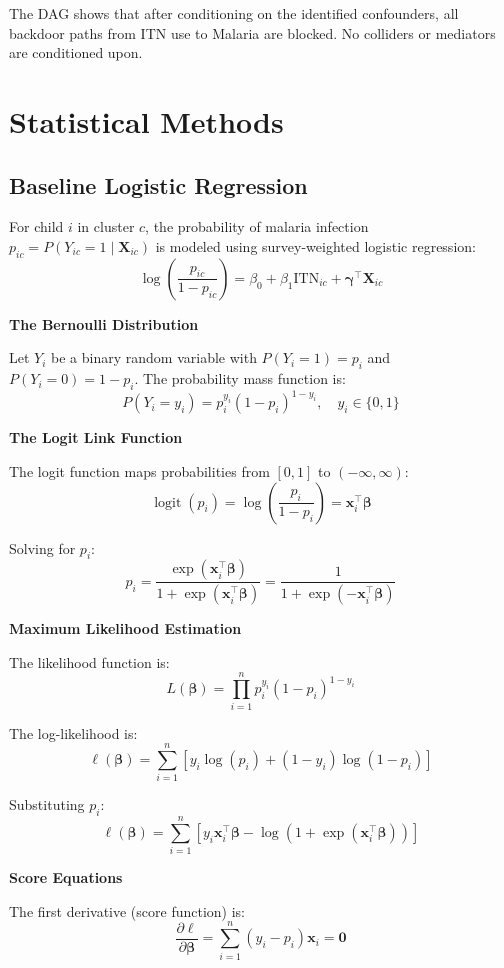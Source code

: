 The DAG shows that after conditioning on the identified confounders, all backdoor paths from ITN use to Malaria are blocked. No colliders or mediators are conditioned upon.

\section{Statistical Methods}

\subsection{Baseline Logistic Regression}

For child $i$ in cluster $c$, the probability of malaria infection $p_{ic} = P(Y_{ic} = 1 \mid \mathbf{X}_{ic})$ is modeled using survey-weighted logistic regression:
\[
\log\left(\frac{p_{ic}}{1-p_{ic}}\right) = \beta_0 + \beta_1 \text{ITN}_{ic} + \boldsymbol{\gamma}^\top \mathbf{X}_{ic}
\]

\textbf{The Bernoulli Distribution}

Let $Y_i$ be a binary random variable with $P(Y_i = 1) = p_i$ and $P(Y_i = 0) = 1 - p_i$. The probability mass function is:
\[
P(Y_i = y_i) = p_i^{y_i} (1 - p_i)^{1 - y_i}, \quad y_i \in \{0, 1\}
\]

\textbf{The Logit Link Function}

The logit function maps probabilities from $[0,1]$ to $(-\infty, \infty)$:
\[
\operatorname{logit}(p_i) = \log\left(\frac{p_i}{1-p_i}\right) = \mathbf{x}_i^\top \boldsymbol{\beta}
\]

Solving for $p_i$:
\[
p_i = \frac{\exp(\mathbf{x}_i^\top \boldsymbol{\beta})}{1 + \exp(\mathbf{x}_i^\top \boldsymbol{\beta})} = \frac{1}{1 + \exp(-\mathbf{x}_i^\top \boldsymbol{\beta})}
\]

\textbf{Maximum Likelihood Estimation}

The likelihood function is:
\[
L(\boldsymbol{\beta}) = \prod_{i=1}^n p_i^{y_i} (1-p_i)^{1-y_i}
\]

The log-likelihood is:
\[
\ell(\boldsymbol{\beta}) = \sum_{i=1}^n \left[ y_i \log(p_i) + (1-y_i) \log(1-p_i) \right]
\]

Substituting $p_i$:
\[
\ell(\boldsymbol{\beta}) = \sum_{i=1}^n \left[ y_i \mathbf{x}_i^\top \boldsymbol{\beta} - \log(1 + \exp(\mathbf{x}_i^\top \boldsymbol{\beta})) \right]
\]

\textbf{Score Equations}

The first derivative (score function) is:
\[
\frac{\partial \ell}{\partial \boldsymbol{\beta}} = \sum_{i=1}^n (y_i - p_i) \mathbf{x}_i = \mathbf{0}
\]


